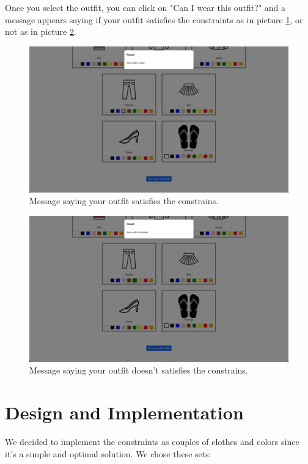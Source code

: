 \documentclass[12pt]{article}
\begin{document}
Once you select the outfit, you can click on "Can I wear this outfit?" and a message appears saying if your outfit satisfies the constraints as in picture \ref{is-ok}, or not as in picture \ref{not-ok}.

\begin{figure}
  \includegraphics[width=\linewidth]{is-ok.jpg}
  \caption{Message saying your outfit satisfies the constrains.}
  \label{is-ok}
\end{figure}

\begin{figure}
  \includegraphics[width=\linewidth]{not-ok.jpg}
  \caption{Message saying your outfit doesn't satisfies the constrains.}
  \label{not-ok}
\end{figure}

\section{Design and Implementation}
We decided to implement the constraints as couples of clothes and colors since it's a simple and optimal solution. We chose these sets:
\end{document}
